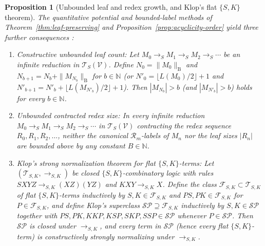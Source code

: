\documentclass[11pt,reqno]{amsart}
\numberwithin{equation}{section}
\theoremstyle{plain}
\newtheorem{proposition}[theorem]{Proposition}
\theoremstyle{definition}
\theoremstyle{remark}
\newcommand{\TSV}{\mathcal{T}_S(\mathcal{V})}
\newcommand{\redS}{\to_S}
\begin{document}
\begin{proposition}[Unbounded leaf and redex growth, and Klop's flat $\{S,K\}$ theorem]\label{prop:remark16-klop18}
The quantitative potential and bounded-label methods of Theorem~\ref{thm:leaf-preserving} and Proposition~\ref{prop:acyclicity-order} yield three further consequences \cite[Remark~16 and Theorem~18, p.~89]{BarendregtEndrullisKlopWaldmann2017}:
\begin{enumerate}[label=(\roman*),leftmargin=2.2em]
  \item \emph{Constructive unbounded leaf count:} Let $M_0 \redS M_1 \redS M_2 \redS \cdots$ be an infinite reduction in $\TSV$. Define $N_0 = \|M_0\|_{\mathrm{B}}$ and $N_{b+1} = N_b + \|M_{N_b}\|_{\mathrm{B}}$ for $b \in \mathbb{N}$ (or $N'_0 = \lfloor L(M_0)/2 \rfloor + 1$ and $N'_{b+1} = N'_b + \lfloor L(M_{N'_b})/2 \rfloor + 1$). Then $|M_{N_b}| > b$ (and $|M_{N'_b}| > b$) holds for every $b \in \mathbb{N}$.
  \item \emph{Unbounded contracted redex size:} In every infinite reduction $M_0 \redS M_1 \redS M_2 \redS \cdots$ in $\TSV$ contracting the redex sequence $R_0, R_1, R_2, \dots$, neither the canonical $\mathcal{R}_m$-labels of $M_n$ nor the leaf sizes $|R_n|$ are bounded above by any constant $B \in \mathbb{N}$.
  \item \emph{Klop's strong normalization theorem for flat $\{S,K\}$-terms:} Let $(\mathcal{T}_{S,K}, \to_{S,K})$ be closed $\{S, K\}$-combinatory logic with rules $S X Y Z \to_{S,K} (X Z)(Y Z)$ and $K X Y \to_{S,K} X$. Define the class $\mathcal{F}_{S,K} \subset \mathcal{T}_{S,K}$ of \emph{flat $\{S,K\}$-terms} inductively by $S, K \in \mathcal{F}_{S,K}$ and $P S, P K \in \mathcal{F}_{S,K}$ for $P \in \mathcal{F}_{S,K}$, and define Klop's superclass $\mathcal{SP} \supseteq \mathcal{F}_{S,K}$ inductively by $S, K \in \mathcal{SP}$ together with $P S, P K, K K P, K S P, S K P, S S P \in \mathcal{SP}$ whenever $P \in \mathcal{SP}$. Then $\mathcal{SP}$ is closed under $\to_{S,K}$, and every term in $\mathcal{SP}$ (hence every flat $\{S,K\}$-term) is constructively strongly normalizing under $\to_{S,K}$.
\end{enumerate}
\end{proposition}
\end{document}
